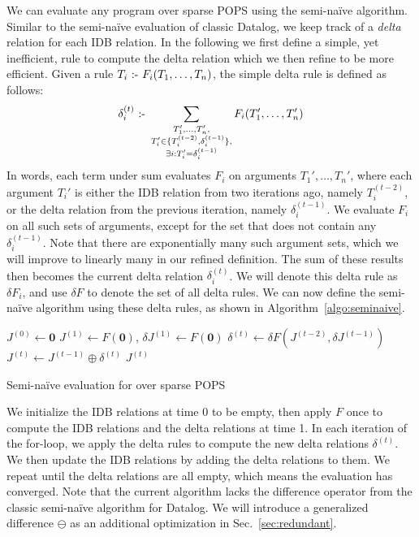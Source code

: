 We can evaluate any \datalogo program over sparse POPS using 
 the semi-na\"ive algorithm. 
Similar to the semi-na\"ive evaluation of classic Datalog, 
 we keep track of a {\em delta} relation for each IDB relation.
In the following we first define a simple, yet inefficient, 
 rule to compute the delta relation
 which we then refine to be more efficient. 
Given a rule $T_i \text{ :- } F_i(T_1, \ldots, T_n)$, 
 the simple delta rule is defined as follows: 
%
$$\delta_i^{(t)} \text{ :- } \sum_{
  \substack{
   T_1', \dots, T_n', \\ 
   T_i' \in \{T_i^{(t-2)}, \delta_i^{(t-1)}\}, \\ 
   \exists i : T_i' = \delta_i^{(t-1)} 
   }}
  F_i(T_1', \ldots, T_n') $$
%
In words, each term under sum evaluates $F_i$ on arguments $T_1', \ldots, T_n'$, 
 where each argument $T_i'$ is either the IDB relation from two iterations ago, 
 namely $T_i^{(t-2)}$, or the delta relation from the previous iteration,
 namely $\delta_i^{(t-1)}$.
We evaluate $F_i$ on all such sets of arguments, 
 except for the set that does not contain any $\delta_i^{(t-1)}$.
Note that there are exponentially many such argument sets, 
 which we will improve to linearly many in our refined definition.
The sum of these results then becomes the current delta relation $\delta_i^{(t)}$.
We will denote this delta rule as $\delta F_i$,
 and use $\delta F$ to denote the set of all delta rules.
We can now define the semi-na\"ive algorithm using these delta rules, 
 as shown in Algorithm~\ref{algo:seminaive}.
%
\begin{algorithm}[t]
  $J^{(0)} \leftarrow \bm 0$\;
  $J^{(1)} \leftarrow F(\bm 0)$, $\delta J^{(1)} \gets F(\bm 0)$ \;
 {
     {$\delta^{(t)} \leftarrow \delta F(J^{(t-2)}, \delta J^{(t-1)})$} \label{algo:sn:delta} \; 
     {$J^{(t)} \leftarrow J^{(t-1)} \oplus \delta^{(t)}$}\;
 }
 \Return $J^{(t)}$
 \caption{Semi-na\"ive evaluation for \datalogo over sparse POPS}
 \label{algo:seminaive}
\end{algorithm}
%
We initialize the IDB relations at time $0$ to be empty, 
 then apply $F$ once to compute the IDB relations and the delta relations 
 at time 1.
In each iteration of the for-loop, we apply the delta rules to compute the 
 new delta relations $\delta^{(t)}$.
We then update the IDB relations by adding the delta relations to them. 
We repeat until the delta relations are all empty, 
 which means the evaluation has converged.
Note that the current algorithm lacks the difference operator 
 from the classic semi-na\"ive algorithm for Datalog.
We will introduce a generalized difference $\ominus$ as an 
 additional optimization in Sec.~\ref{sec:redundant}.

